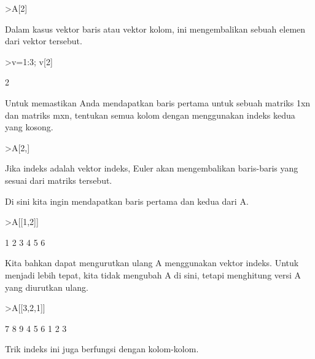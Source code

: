 \documentclass[a4paper,10pt]{article}
\begin{document}
\begin{eulernotebook}
\begin{eulercomment}
\begin{eulercomment}
\begin{eulercomment}
\begin{eulercomment}
\begin{eulercomment}
\begin{eulercomment}
\begin{eulercomment}
\begin{eulercomment}
\begin{eulercomment}
\end{eulercomment}
\begin{eulerprompt}
>A[2]
\end{eulerprompt}
\begin{euleroutput}
  [4,  5,  6]
\end{euleroutput}
\begin{eulercomment}
Dalam kasus vektor baris atau vektor kolom, ini mengembalikan sebuah
elemen dari vektor tersebut.
\end{eulercomment}
\begin{eulerprompt}
>v=1:3; v[2]
\end{eulerprompt}
\begin{euleroutput}
  2
\end{euleroutput}
\begin{eulercomment}
Untuk memastikan Anda mendapatkan baris pertama untuk sebuah matriks
1xn dan matriks mxn, tentukan semua kolom dengan menggunakan indeks
kedua yang kosong.
\end{eulercomment}
\begin{eulerprompt}
>A[2,]
\end{eulerprompt}
\begin{euleroutput}
  [4,  5,  6]
\end{euleroutput}
\begin{eulercomment}
Jika indeks adalah vektor indeks, Euler akan mengembalikan baris-baris
yang sesuai dari matriks tersebut.

Di sini kita ingin mendapatkan baris pertama dan kedua dari A.
\end{eulercomment}
\begin{eulerprompt}
>A[[1,2]]
\end{eulerprompt}
\begin{euleroutput}
              1             2             3 
              4             5             6 
\end{euleroutput}
\begin{eulercomment}
Kita bahkan dapat mengurutkan ulang A menggunakan vektor indeks. Untuk
menjadi lebih tepat, kita tidak mengubah A di sini, tetapi menghitung
versi A yang diurutkan ulang.
\end{eulercomment}
\begin{eulerprompt}
>A[[3,2,1]]
\end{eulerprompt}
\begin{euleroutput}
              7             8             9 
              4             5             6 
              1             2             3 
\end{euleroutput}
\begin{eulercomment}
Trik indeks ini juga berfungsi dengan kolom-kolom.


\end{eulercomment}
\end{eulercomment}
\end{eulercomment}
\end{eulercomment}
\end{eulercomment}
\end{eulercomment}
\end{eulercomment}
\end{eulercomment}
\end{eulercomment}
\end{eulernotebook}
\end{document}
